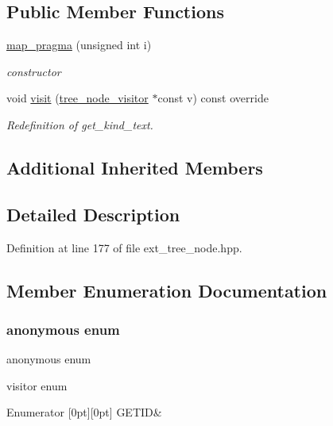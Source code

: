 \subsection*{Public Member Functions}
\begin{DoxyCompactItemize}
\item 
\hyperlink{structmap__pragma_a521029a52b648ec3632efc646e12e901}{map\+\_\+pragma} (unsigned int i)
\begin{DoxyCompactList}\small\item\em constructor \end{DoxyCompactList}\item 
void \hyperlink{structmap__pragma_a418af88fad63d1e91a1d1b12bc19b70c}{visit} (\hyperlink{classtree__node__visitor}{tree\+\_\+node\+\_\+visitor} $\ast$const v) const override
\begin{DoxyCompactList}\small\item\em Redefinition of get\+\_\+kind\+\_\+text. \end{DoxyCompactList}\end{DoxyCompactItemize}
\subsection*{Additional Inherited Members}


\subsection{Detailed Description}


Definition at line 177 of file ext\+\_\+tree\+\_\+node.\+hpp.



\subsection{Member Enumeration Documentation}
\mbox{\label{structmap__pragma_a98dab333f6246766d781ca919ba58d7a}} 
\subsubsection{\texorpdfstring{anonymous enum}{anonymous enum}}
{\footnotesize\ttfamily anonymous enum}



visitor enum 

\begin{DoxyEnumFields}{Enumerator}
[0pt][0pt]{}\mbox{\label{structmap__pragma_a98dab333f6246766d781ca919ba58d7aae34e8ec97a6c21f5d2db40350d239a67}} 
G\+E\+T\+ID&\\
\hline

\end{DoxyEnumFields}


